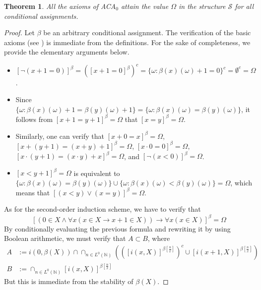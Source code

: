 \documentclass{jloganal}
\numberwithin{equation}{section}
\theoremstyle{plain}
\newtheorem{theorem}[subsection]{Theorem}
\begin{document}
\begin{theorem}\label{th:model}
All the axioms of ACA$_0$ attain the value $\Omega$ in the structure $\mathcal{S}$ for all conditional assignments. 
\end{theorem}
\begin{proof}
Let $\beta$ be an arbitrary conditional assignment. 
The verification of the basic axioms (see \cite[p.~4]{simpson2009subsystems}) is immediate from the definitions.  
For the sake of completeness, we provide the elementary arguments below. 
\begin{itemize}
\item $[\neg (x+1=0)]^{ \beta}=([x+1=0]^{ \beta})^c=\{\omega\colon \beta(x)(\omega)+1=0\}^c=\emptyset^c=\Omega$. 
\item Since $\{\omega\colon \beta(x)(\omega)+1=\beta(y)(\omega)+1\}=\{\omega\colon \beta(x)(\omega)=\beta(y)(\omega)\}$, it follows from $[x+1=y+1]^{ \beta}=\Omega$ that $[x=y]^{ \beta}=\Omega$.
\item Similarly, one can verify that $[x+0=x]^{ \beta}=\Omega$, $[x+(y+1)=(x+y)+1]^{ \beta}=\Omega$, $[x\cdot 0=0]^{ \beta}=\Omega$, $[x\cdot (y+1)=(x\cdot y)+x]^{ \beta}=\Omega$, and $[\neg(x<0)]^{\beta}=\Omega$. 
\item $[x<y+1]^{\beta}=\Omega$ is equivalent to $\{\omega\colon \beta(x)(\omega)=\beta(y)(\omega)\}\cup \{\omega\colon \beta(x)(\omega)<\beta(y)(\omega)\}=\Omega$, which means that $[(x<y)\vee (x=y)]^{ \beta}=\Omega$. 
\end{itemize}
As for the second-order induction scheme, we have to verify that 
\[
[(0\in X \wedge \forall x(x\in X \rightarrow  x+1\in X))\rightarrow \forall x(x\in X)]^{ \beta}=\Omega
\]
By conditionally evaluating the previous formula and rewriting it by using Boolean arithmetic, we must verify that $A\subset B$, where 
\begin{align*}
A&:=i(0,\beta(X))\cap \cap_{n\in L^0(\mathbb{N})} (([i(x,X)]^{\beta[\frac{n}{x}]})^c \cup [i(x+1,X)]^{\beta[\frac{n}{x}]})\\
B&:=\cap_{n\in L^0(\mathbb{N})} [i(x,X)]^{\beta[\frac{n}{x}]}
\end{align*}
But this is immediate from the stability of $\beta(X)$.  


\end{proof}
\end{document}

